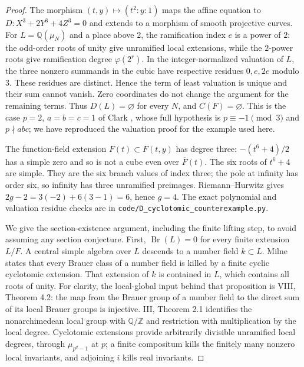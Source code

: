 \documentclass[11pt,a4paper]{article}
\begin{document}
\begin{proof}
The morphism $(t,y)\mapsto(t^2:y:1)$ maps the affine equation to
$D:X^3+2Y^3+4Z^3=0$ and extends to a morphism of smooth projective curves.
For $L=\mathbb Q(\mu_N)$ and a place above $2$, the ramification index
$e$ is a power of $2$: the odd-order roots of unity give unramified local
extensions, while the $2$-power roots give ramification degree
$\varphi(2^r)$.  In the integer-normalized valuation of $L$, the three
nonzero summands in the cubic have respective residues $0,e,2e$ modulo
$3$.  These residues are distinct.  Hence the term of least valuation is
unique and their sum cannot vanish.  Zero coordinates do not change the
argument for the remaining terms.  Thus $D(L)=\varnothing$ for every
$N$, and $C(F)=\varnothing$.  This is the case $p=2$, $a=b=c=1$ of
Clark \cite[Theorem 1]{D_Clark2006}, whose full hypothesis is
$p\equiv-1\pmod3$ and $p\nmid abc$; we have reproduced the valuation
proof for the example used here.

The function-field extension $F(t)\subset F(t,y)$ has degree three:
$-(t^6+4)/2$ has a simple zero and so is not a cube even over
$\overline F(t)$.  The six roots of $t^6+4$ are simple.  They are the six
branch values of index three; the pole at infinity has order six, so
infinity has three unramified preimages.  Riemann--Hurwitz gives
$2g-2=3(-2)+6(3-1)=6$, hence $g=4$.  The exact polynomial and valuation
residue checks are in \texttt{code/D\_cyclotomic\_counterexample.py}.

We give the section-existence argument, including the finite lifting
step, to avoid assuming any section conjecture.  First,
$\operatorname{Br}(L)=0$ for every finite extension $L/F$.
A central simple algebra over $L$ descends to a number field $k\subset L$.
Milne \cite[VII, Proposition 7.2]{D_MilneCFT} states that every Brauer
class of a number field is killed by a finite cyclic cyclotomic extension.
That extension of $k$ is contained in $L$, which contains all roots of
unity.  For clarity, the local-global input behind that proposition is
VIII, Theorem 4.2: the map from the Brauer group of a number field to the
direct sum of its local Brauer groups is injective.  III, Theorem 2.1
identifies the nonarchimedean local group with $\mathbb Q/\mathbb Z$ and
restriction with multiplication by the local degree.  Cyclotomic
extensions provide arbitrarily divisible unramified local degrees,
through $\mu_{p^d-1}$ at $p$; a finite compositum kills the finitely many
nonzero local invariants, and adjoining $i$ kills real invariants.


\end{proof}
\end{document}
